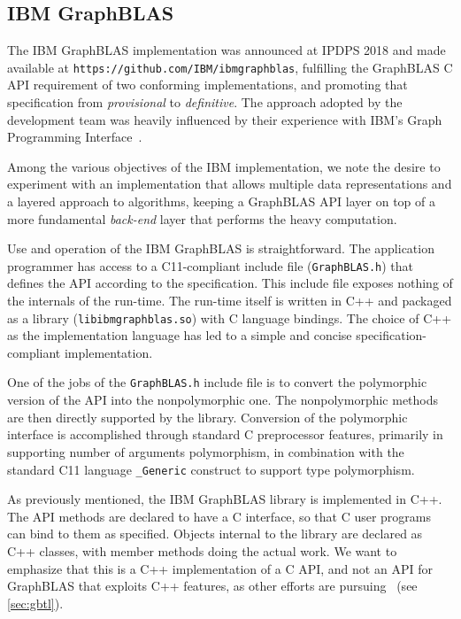 \subsection{IBM GraphBLAS}

\newcommand{\code}[1]{{\tt #1}}

The IBM GraphBLAS implementation was announced at IPDPS 2018 and made
available at \code{https://github.com/IBM/ibmgraphblas}, fulfilling
the GraphBLAS C API requirement of two conforming implementations,
and promoting that specification from \emph{provisional} to
\emph{definitive}. The approach adopted by the development team was
heavily influenced by their experience with IBM's Graph Programming
Interface~\cite{gpi2016,GPI}.

Among the various objectives of the IBM implementation, we note the
desire to experiment with an implementation that allows multiple data
representations and a layered approach to algorithms, keeping a GraphBLAS
API layer on top of a more fundamental \emph{back-end} layer that performs
the heavy computation.

Use and operation of the IBM GraphBLAS is straightforward.
The application programmer has access to a C11-compliant include
file (\code{GraphBLAS.h}) that defines the API according to the
specification. This include file exposes nothing of the internals of
the run-time. The run-time itself is written in C++ and packaged as a
library (\code{libibmgraphblas.so}) with C language bindings.  The choice
of C++ as the implementation language has led to a simple and concise
specification-compliant implementation.

One of the jobs of the \code{GraphBLAS.h} include file is to
convert the polymorphic version of the API into the nonpolymorphic
one. The nonpolymorphic methods are then directly supported by the
library. Conversion of the polymorphic interface is accomplished through
standard C preprocessor features, primarily in supporting number of
arguments polymorphism, in combination with the standard C11 language
\code{\_Generic} construct to support type polymorphism.

As previously mentioned, the IBM GraphBLAS library is implemented in
C++. The API methods are declared to have a C interface, so that C user
programs can bind to them as specified. Objects internal to the library
are declared as C++ classes, with member methods doing the actual work.
We want to emphasize that this is a C++ implementation of a C API, and
not an API for GraphBLAS that exploits C++ features, as other efforts
are pursuing~\cite{gbtl-github} (see \autoref{sec:gbtl}).


